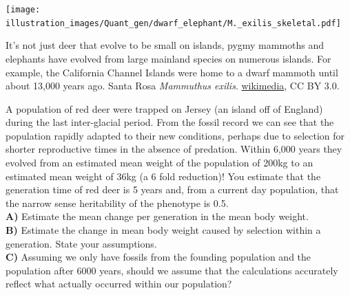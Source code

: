 
 \begin{marginfigure}
 \begin{center}
 \texttt{[image: illustration\_images/Quant\_gen/dwarf\_elephant/M.\_exilis\_skeletal.pdf]} \end{center}
 \caption{It's not just deer that evolve to be small on islands,
  pygmy mammoths and elephants have evolved from large mainland species
  on numerous islands. For example, the
   California Channel Islands were home to a dwarf mammoth until about 13,000 years
   ago. \newline \noindent \tiny{Santa
   Rosa {\it Mammuthus exilis}. \href{https://en.wikipedia.org/wiki/Pygmy_mammoth#/media/File:M._exilis_skeletal.png}{wikimedia}, CC BY 3.0.}
 }   \label{Fig:Response_num_alleles}
 \end{marginfigure}
\begin{question}
A population of red deer were trapped on Jersey (an island off of
England) during the last inter-glacial period. From the fossil record \cite{lister:89}
we can see that the population rapidly adapted to their new
conditions, perhaps due to selection for shorter reproductive times in
the absence of predation. Within 6,000 years they evolved from an estimated mean weight of
the population of 200kg to an estimated mean weight of 36kg (a 6 fold
reduction)! You estimate that the generation time
of red deer is 5 years and, from a current day population, that the narrow sense heritability of the
phenotype is 0.5.\\
{\bf A)}	Estimate the mean change per generation in the mean body weight. \\

{\bf B)}	Estimate the change in mean body weight caused by
selection within a generation. State your assumptions.\\

{\bf C)}	Assuming we only have fossils from the founding population and the population after 6000 years, should we assume that the calculations accurately reflect what actually occurred within our population?
\end{question}

